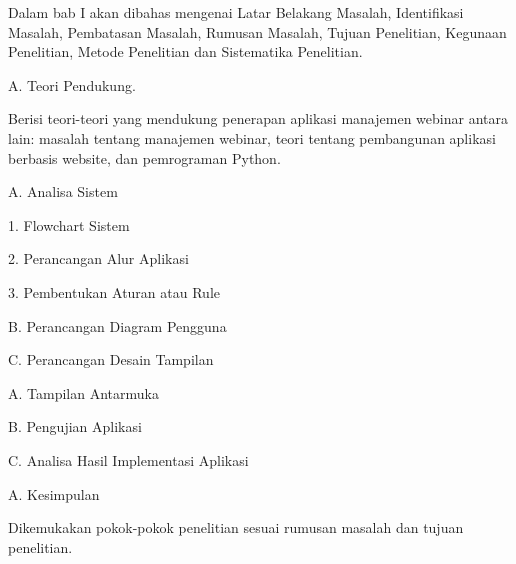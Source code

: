 \setlength{\leftskip}{4em} \indent Dalam bab I akan dibahas mengenai Latar
Belakang Masalah, Identifikasi Masalah, Pembatasan Masalah, Rumusan Masalah,
Tujuan Penelitian, Kegunaan Penelitian, Metode Penelitian dan Sistematika
Penelitian.

\setlength{\leftskip}{2em}

A. Teori Pendukung.

\setlength{\leftskip}{4em} \indent Berisi teori-teori yang mendukung penerapan
aplikasi manajemen webinar antara lain: masalah tentang manajemen webinar,
teori tentang pembangunan aplikasi berbasis website, dan pemrograman Python.

\setlength{\leftskip}{2em}

A. Analisa Sistem

\setlength{\leftskip}{4em}
1. Flowchart Sistem

2. Perancangan Alur Aplikasi

3. Pembentukan Aturan atau Rule

\setlength{\leftskip}{2em}
B.  Perancangan Diagram Pengguna

C.  Perancangan Desain Tampilan

\setlength{\leftskip}{2em}

A. Tampilan Antarmuka

B.	Pengujian Aplikasi

C.	Analisa Hasil Implementasi Aplikasi

\setlength{\leftskip}{2em}

A. Kesimpulan

\setlength{\leftskip}{4em}
Dikemukakan pokok-pokok penelitian sesuai rumusan masalah dan tujuan penelitian.



